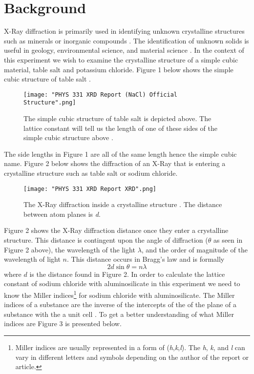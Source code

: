 \documentclass[twocolumn]{article}
\begin{document}
\section*{Background}
X-Ray diffraction is primarily used in identifying unknown crystalline structures such as minerals or inorganic compounds \cite{XRDDiffrac}. The identification of unknown solids is useful in geology, environmental science, and material science \cite{Qian}. In the context of this experiment we wish to examine the crystalline structure of a simple cubic material, table salt and potassium chloride. Figure 1 below shows the simple cubic structure of table salt \cite{Ionic}.
\begin{figure}[htbp]
\begin{center}
\texttt{[image: "PHYS 331 XRD Report (NaCl) Official Structure".png]}
\caption{The simple cubic structure of table salt is depicted above. The lattice constant will tell us the length of one of these sides of the simple cubic structure above \cite{Ionic}.}
\label{Fig1}
\end{center}
\end{figure}
\newline
The side lengths in Figure 1 are all of the same length hence the simple cubic name. Figure 2 below shows the diffraction of an X-Ray that is entering a crystalline structure such as table salt or sodium chloride.
\begin{figure}[htbp]
\begin{center}
\texttt{[image: "PHYS 331 XRD Report XRD".png]}
\caption{The X-Ray diffraction inside a crystalline structure \cite{X-RayCryst}. The distance between atom planes is \textit{d}.}
\label{Fig2}
\end{center}
\end{figure}
\newline
Figure 2 shows the X-Ray diffraction distance once they enter a crystalline structure. This distance is contingent upon the angle of diffraction ($\theta$ as seen in Figure 2 above), the wavelength of the light $\lambda$, and the order of magnitude of the wavelength of light $n$. This distance occurs in Bragg's law and is formally
\begin{equation}\label{1}
2d\sin{\theta}=n\lambda
\end{equation}
where $d$ is the distance found in Figure 2. In order to calculate the lattice constant of sodium chloride with aluminosilicate in this experiment we need to know the Miller indices\footnote{Miller indices are usually represented in a form of (\textit{h},\textit{k},\textit{l}). The \textit{h}, \textit{k}, and \textit{l} can vary in different letters and symbols depending on the author of the report or article.} for sodium chloride with aluminosilicate. The Miller indices of a substance are the inverse of the intercepts of the of the plane of a substance with the a unit cell \cite{WikiCrystal}. To get a better understanding of what Miller indices are Figure 3 is presented below.
\end{document}
